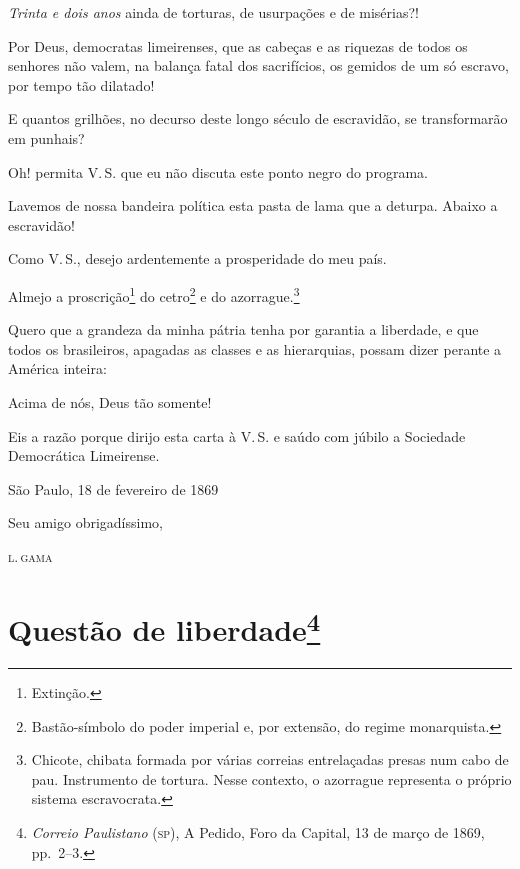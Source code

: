\emph{Trinta e dois anos} ainda de torturas, de usurpações e de
misérias?!

Por Deus, democratas limeirenses, que as cabeças e as riquezas de todos
os senhores não valem, na balança fatal dos sacrifícios, os gemidos de
um só escravo, por tempo tão dilatado!

E quantos grilhões, no decurso deste longo século de escravidão, se
transformarão em punhais?

Oh! permita V.\,S. que eu não discuta este ponto negro do programa.

Lavemos de nossa bandeira política esta pasta de lama que a deturpa.
Abaixo a escravidão!

\noindent\dotfill

Como V.\,S., desejo ardentemente a prosperidade do meu país.

Almejo a proscrição\footnote{Extinção.} do cetro\footnote{
  Bastão-símbolo do poder imperial e, por extensão, do regime
  monarquista.} e do azorrague.\footnote{Chicote, chibata formada por
  várias correias entrelaçadas presas num cabo de pau. Instrumento de
  tortura. Nesse contexto, o azorrague representa o próprio sistema
  escravocrata.}

Quero que a grandeza da minha pátria tenha por garantia a liberdade, e
que todos os brasileiros, apagadas as classes e as hierarquias, possam
dizer perante a América inteira:

Acima de nós, Deus tão somente!

Eis a razão porque dirijo esta carta à V.\,S. e saúdo com júbilo a
Sociedade Democrática Limeirense.

\begin{flushright}
São Paulo, 18 de fevereiro de 1869

Seu amigo obrigadíssimo,

\textsc{l.\,gama}
\end{flushright}

\chapter{Questão de liberdade\footnote{\emph{Correio Paulistano} (\textsc{sp}),
  A Pedido, Foro da Capital, 13 de março de 1869, pp.~2--3.}}

